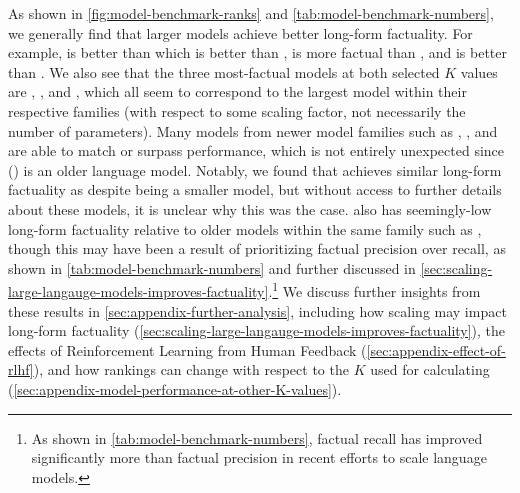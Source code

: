 \documentclass{article}
\theoremstyle{plain}
\theoremstyle{definition}
\theoremstyle{remark}
\begin{document}
As shown in \cref{fig:model-benchmark-ranks} and \cref{tab:model-benchmark-numbers}, we generally find that larger models achieve better long-form factuality.
For example, \gptfourturbo{} is better than \gptfour{} which is better than \chatgpt{}, \geminiultra{} is more factual than \geminipro{}, and \ulmlitrlhf{} is better than \ulmlit{}.
We also see that the three most-factual models at both selected $K$ values are \gptfourturbo{}, \geminiultra{}, and \ulmlitrlhf{}, which all seem to correspond to the largest model within their respective families (with respect to some scaling factor, not necessarily the number of parameters).
Many models from newer model families such as \gemini{}, \claudeopus{}, and \claudesonnet{} are able to match or surpass \gptfour{} performance, which is not entirely unexpected since \gptfour{} (\gptfourfull{}) is an older language model.
Notably, we found that \claudesonnet{} achieves similar long-form factuality as \claudeopus{} despite being a smaller model, but without access to further details about these models, it is unclear why this was the case.
\claudehaiku{} also has seemingly-low long-form factuality relative to older models within the same family such as \claudeinstant{}, though this may have been a result of prioritizing factual precision over recall, as shown in \cref{tab:model-benchmark-numbers} and further discussed in \cref{sec:scaling-large-langauge-models-improves-factuality}.\footnote{As shown in \cref{tab:model-benchmark-numbers}, factual recall has improved significantly more than factual precision in recent efforts to scale language models.}
We discuss further insights from these results in \cref{sec:appendix-further-analysis}, including how scaling may impact long-form factuality (\cref{sec:scaling-large-langauge-models-improves-factuality}), the effects of Reinforcement Learning from Human Feedback (\cref{sec:appendix-effect-of-rlhf}), and how rankings can change with respect to the $K$ used for calculating \metric{} (\cref{sec:appendix-model-performance-at-other-K-values}).


\end{document}
